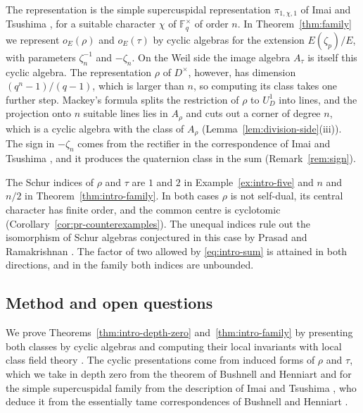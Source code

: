 \documentclass[a4paper,11pt]{amsart}
\theoremstyle{definition}
\theoremstyle{remark}
\numberwithin{equation}{section}
\newcommand{\F}{\mathbb{F}}
\begin{document}
The representation is the simple supercuspidal representation $\pi_{1,\chi,1}$ of Imai and Tsushima \cite[\S5.1]{IT20}, for a suitable character $\chi$ of $\F_q^\times$ of order $n$. In Theorem~\ref{thm:family} we represent $o_E(\rho)$ and $o_E(\tau)$ by cyclic algebras for the extension $E(\zeta_p)/E$, with parameters $\zeta_n^{-1}$ and $-\zeta_n$. On the Weil side the image algebra $A_\tau$ is itself this cyclic algebra. The representation $\rho$ of $D^\times$, however, has dimension $(q^n-1)/(q-1)$, which is larger than $n$, so computing its class takes one further step. Mackey's formula splits the restriction of $\rho$ to $U^1_D$ into lines, and the projection onto $n$ suitable lines lies in $A_\rho$ and cuts out a corner of degree $n$, which is a cyclic algebra with the class of $A_\rho$ (Lemma~\ref{lem:division-side}(iii)). The sign in $-\zeta_n$ comes from the rectifier in the correspondence of Imai and Tsushima \cite[Proposition~5.4]{IT20}, and it produces the quaternion class in the sum (Remark~\ref{rem:sign}).

The Schur indices of $\rho$ and $\tau$ are $1$ and $2$ in Example~\ref{ex:intro-five} and $n$ and $n/2$ in Theorem~\ref{thm:intro-family}. In both cases $\rho$ is not self-dual, its central character has finite order, and the common centre is cyclotomic (Corollary~\ref{cor:pr-counterexamples}). The unequal indices rule out the isomorphism of Schur algebras conjectured in this case by Prasad and Ramakrishnan \cite[Conjecture~6.1(1)]{PR12}. The factor of two allowed by \eqref{eq:intro-sum} is attained in both directions, and in the family both indices are unbounded.

\subsection{Method and open questions}\label{subsec:intro-method}

We prove Theorems~\ref{thm:intro-depth-zero} and~\ref{thm:intro-family} by presenting both classes by cyclic algebras and computing their local invariants with local class field theory \cite{Mil20}. The cyclic presentations come from induced forms of $\rho$ and $\tau$, which we take in depth zero from the theorem of Bushnell and Henniart \cite[6.3, Corollary~1]{BH11L} and for the simple supercuspidal family from the description of Imai and Tsushima \cite[Proposition~5.4]{IT20}, who deduce it from the essentially tame correspondences of Bushnell and Henniart \cite{BH05,BH11J}. 
\end{document}
